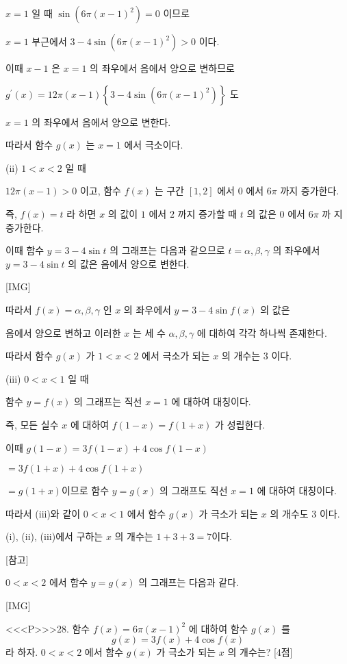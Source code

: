 \documentclass{oblivoir}
\begin{document}
$x=1$ 일 때 $\sin \left(6 \pi(x-1)^{2}\right)=0$ 이므로

$x=1$ 부근에서 $3-4 \sin \left(6 \pi(x-1)^{2}\right)>0$
이다.

이때 $x-1$ 은 $x=1$ 의 좌우에서 음에서 양으로 변하므로

$g^{\prime}(x)=12 \pi(x-1)\left\{3-4 \sin \left(6 \pi(x-1)^{2}\right)\right\}$ 도

$x=1$ 의 좌우에서 음에서 양으로 변한다.

따라서 함수 $g(x)$ 는 $x=1$ 에서 극소이다.

(ii) $1< x< 2$ 일 때

$12 \pi(x-1)>0$ 이고, 함수 $f(x)$ 는 구간 $[1,2]$ 에서 $0$ 에서 $6 \pi$ 까지 증가한다.

즉, $f(x)=t$ 라 하면 $x$ 의 값이 $1$ 에서 $2$ 까지 증가할 때 $t$ 의 값은 $0$ 에서 $6 \pi$ 까
지 증가한다.

이때 함수 $y=3-4 \sin t$ 의 그래프는 다음과 같으므로 $t=\alpha, \beta, \gamma$ 의 좌우에서
$y=3-4 \sin t$ 의 값은 음에서 양으로 변한다.

[IMG]

따라서 $f(x)=\alpha, \beta, \gamma$ 인 $x$ 의 좌우에서 $y=3-4 \sin f(x)$ 의 값은

음에서 양으로 변하고 이러한 $x$ 는 세 수 $\alpha, \beta, \gamma$ 에 대하여 각각 하나씩 존재한다.

따라서 함수 $g(x)$ 가 $1< x< 2$ 에서 극소가 되는 $x$ 의 개수는 $3$ 이다.

(iii) $0< x< 1$ 일 때

함수 $y=f(x)$ 의 그래프는 직선 $x=1$ 에 대하여 대칭이다.

즉, 모든 실수 $x$ 에 대하여 $f(1-x)=f(1+x)$ 가 성립한다.

이때
$g(1-x)=3 f(1-x)+4 \cos f(1-x)$

$=3 f(1+x)+4 \cos f(1+x)$

$=g(1+x)$이므로 함수 $y=g(x)$ 의 그래프도 직선 $x=1$ 에 대하여 대칭이다.

따라서 (iii)와 같이 $0< x< 1$ 에서 함수 $g(x)$ 가 극소가 되는 $x$ 의 개수도 $3$ 이다.

(i), (ii), (iii)에서 구하는 $x$ 의 개수는 $1+3+3=7$이다.

[참고]

$0< x< 2$ 에서 함수 $y=g(x)$ 의 그래프는 다음과 같다.

[IMG]

<<<P>>>28. 함수 $f(x)=6 \pi(x-1)^{2}$ 에 대하여 함수 $g(x)$ 를
$$
g(x)=3 f(x)+4 \cos f(x)
$$
라 하자. $0< x< 2$ 에서 함수 $g(x)$ 가 극소가 되는 $x$ 의 개수는? [4점]
\end{document}
